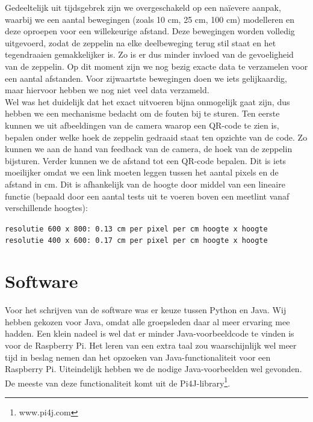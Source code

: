 \documentclass[eind]{penoverslag}
\begin{document}
Gedeeltelijk uit tijdsgebrek zijn we overgeschakeld op een na\"ievere aanpak, waarbij we een aantal bewegingen (zoals 10 cm, 25 cm, 100 cm) modelleren en deze oproepen voor een willekeurige afstand. Deze bewegingen worden volledig uitgevoerd, zodat de zeppelin na elke deelbeweging terug stil staat en het tegendraaien gemakkelijker is. Zo is er dus minder invloed van de gevoeligheid van de zeppelin. Op dit moment zijn we nog bezig exacte data te verzamelen voor een aantal afstanden. Voor zijwaartste bewegingen doen we iets gelijkaardig, maar hiervoor hebben we nog niet veel data verzameld. \\

Wel was het duidelijk dat het exact uitvoeren bijna onmogelijk gaat zijn, dus hebben we een mechanisme bedacht om de fouten bij te sturen. Ten eerste kunnen we uit afbeeldingen van de camera waarop een QR-code te zien is, bepalen onder welke hoek de zeppelin gedraaid staat ten opzichte van de code. Zo kunnen we aan de hand van feedback van de camera, de hoek van de zeppelin bijsturen. Verder kunnen we de afstand tot een QR-code bepalen. Dit is iets moeilijker omdat we een link moeten leggen tussen het aantal pixels en de afstand in cm. Dit is afhankelijk van de hoogte door middel van een lineaire functie (bepaald door een aantal tests uit te voeren boven een meetlint vanaf verschillende hoogtes):

\begin{center}
\texttt{resolutie 600 x 800: 0.13 cm per pixel per cm hoogte x hoogte}\\
\texttt{resolutie 400 x 600: 0.17 cm per pixel per cm hoogte x hoogte}\\
\end{center}

\section{Software}
Voor het schrijven van de software was er keuze tussen Python en Java. Wij hebben gekozen voor Java, omdat alle groepsleden daar al meer ervaring mee hadden. Een klein nadeel is wel dat er minder Java-voorbeeldcode te vinden is voor de Raspberry Pi. Het leren van een extra taal zou waarschijnlijk wel meer tijd in beslag nemen dan het opzoeken van Java-functionaliteit voor een Raspberry Pi. Uiteindelijk hebben we de nodige Java-voorbeelden wel gevonden. De meeste van deze functionaliteit komt uit de Pi4J-library\footnote{www.pi4j.com}. \\
\end{document}
